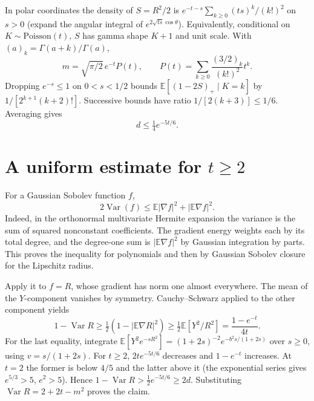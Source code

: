 \documentclass[10pt]{article}
\newcommand{\E}{\mathbb E}
\newcommand{\Var}{\operatorname{Var}}
\begin{document}
In polar coordinates the density of $S=R^2/2$ is $e^{-t-s}\sum_{k\ge0}(ts)^k/(k!)^2$ on $s>0$ (expand the angular integral of $e^{2\sqrt{ts}\cos\theta}$). Equivalently, conditional on $K\sim\mathrm{Poisson}(t)$, $S$ has gamma shape $K+1$ and unit scale. With $(a)_k=\Gamma(a+k)/\Gamma(a)$,
\begin{equation}\label{mean}
 m=\sqrt{\pi/2}\,e^{-t}P(t),\qquad P(t)=\sum_{k\ge0}\frac{(3/2)_k}{(k!)^2}t^k .
\end{equation}
Dropping $e^{-s}\le1$ on $0<s<1/2$ bounds $\E[(1-2S)_+\mid K=k]$ by $1/[2^{k+1}(k+2)!]$. Successive bounds have ratio $1/[2(k+3)]\le 1/6$. Averaging gives
\begin{equation}\label{neg}
 d\le\tfrac14 e^{-5t/6}.
\end{equation}

\section{A uniform estimate for $t\ge2$}
For a Gaussian Sobolev function $f$,
\[
 2\Var(f)\le \E|\nabla f|^2+|\E\nabla f|^2.
\]
Indeed, in the orthonormal multivariate Hermite expansion the variance is the sum of squared nonconstant coefficients. The gradient energy weights each by its total degree, and the degree-one sum is $|\E\nabla f|^2$ by Gaussian integration by parts. This proves the inequality for polynomials and then by Gaussian Sobolev closure for the Lipschitz radius.

Apply it to $f=R$, whose gradient has norm one almost everywhere. The mean of the $Y$-component vanishes by symmetry. Cauchy--Schwarz applied to the other component yields
\[
 1-\Var R\ge\tfrac12(1-|\E\nabla R|^2)
 \ge \tfrac12\E[Y^2/R^2]=\frac{1-e^{-t}}{4t}.
\]
For the last equality, integrate $\E[Y^2e^{-sR^2}]=(1+2s)^{-2}e^{-b^2s/(1+2s)}$ over $s\ge0$, using $v=s/(1+2s)$. For $t\ge2$, $2t e^{-5t/6}$ decreases and $1-e^{-t}$ increases. At $t=2$ the former is below $4/5$ and the latter above it (the exponential series gives $e^{5/3}>5$, $e^2>5$). Hence $1-\Var R>\tfrac12e^{-5t/6}\ge2d$. Substituting $\Var R=2+2t-m^2$ proves the claim.
\end{document}

